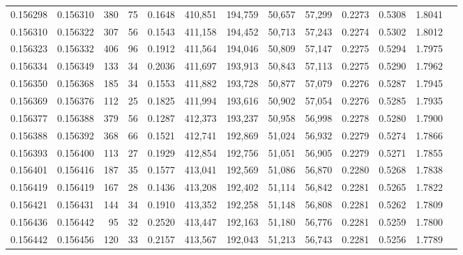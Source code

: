 \begin{tabular}{rrrrrrrrrrrrr}
0.156298 & 0.156310 &   380 &  75 &                                     0.1648 & 410,851 & 194,759 &  50,657 &  57,299 & 0.2273 & 0.5308 & 1.8041 \\
0.156310 & 0.156322 &   307 &  56 &                                     0.1543 & 411,158 & 194,452 &  50,713 &  57,243 & 0.2274 & 0.5302 & 1.8012 \\
0.156323 & 0.156332 &   406 &  96 &                                     0.1912 & 411,564 & 194,046 &  50,809 &  57,147 & 0.2275 & 0.5294 & 1.7975 \\
0.156334 & 0.156349 &   133 &  34 &                                     0.2036 & 411,697 & 193,913 &  50,843 &  57,113 & 0.2275 & 0.5290 & 1.7962 \\
0.156350 & 0.156368 &   185 &  34 &                                     0.1553 & 411,882 & 193,728 &  50,877 &  57,079 & 0.2276 & 0.5287 & 1.7945 \\
0.156369 & 0.156376 &   112 &  25 &                                     0.1825 & 411,994 & 193,616 &  50,902 &  57,054 & 0.2276 & 0.5285 & 1.7935 \\
0.156377 & 0.156388 &   379 &  56 &                                     0.1287 & 412,373 & 193,237 &  50,958 &  56,998 & 0.2278 & 0.5280 & 1.7900 \\
0.156388 & 0.156392 &   368 &  66 &                                     0.1521 & 412,741 & 192,869 &  51,024 &  56,932 & 0.2279 & 0.5274 & 1.7866 \\
0.156393 & 0.156400 &   113 &  27 &                                     0.1929 & 412,854 & 192,756 &  51,051 &  56,905 & 0.2279 & 0.5271 & 1.7855 \\
0.156401 & 0.156416 &   187 &  35 &                                     0.1577 & 413,041 & 192,569 &  51,086 &  56,870 & 0.2280 & 0.5268 & 1.7838 \\
0.156419 & 0.156419 &   167 &  28 &                                     0.1436 & 413,208 & 192,402 &  51,114 &  56,842 & 0.2281 & 0.5265 & 1.7822 \\
0.156421 & 0.156431 &   144 &  34 &                                     0.1910 & 413,352 & 192,258 &  51,148 &  56,808 & 0.2281 & 0.5262 & 1.7809 \\
0.156436 & 0.156442 &    95 &  32 &                                     0.2520 & 413,447 & 192,163 &  51,180 &  56,776 & 0.2281 & 0.5259 & 1.7800 \\
0.156442 & 0.156456 &   120 &  33 &                                     0.2157 & 413,567 & 192,043 &  51,213 &  56,743 & 0.2281 & 0.5256 & 1.7789 \\

\end{tabular}
